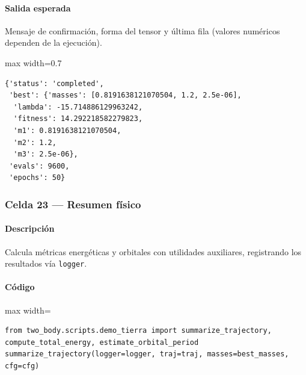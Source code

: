 \paragraph{Salida esperada} Mensaje de confirmación, forma del tensor y última fila (valores numéricos dependen de la ejecución).

\begin{listing}[H]
\caption{Ejemplo Salida}
\begin{adjustbox}{max width=0.7\textwidth}
\begin{minipage}{\textwidth}
\begin{verbatim}
{'status': 'completed',
 'best': {'masses': [0.8191638121070504, 1.2, 2.5e-06],
  'lambda': -15.714886129963242,
  'fitness': 14.292218582279823,
  'm1': 0.8191638121070504,
  'm2': 1.2,
  'm3': 2.5e-06},
 'evals': 9600,
 'epochs': 50}
\end{verbatim}
\end{minipage}
\end{adjustbox}
\end{listing}

\subsubsection*{Celda 23 — Resumen físico}
\paragraph{Descripción} Calcula métricas energéticas y orbitales con utilidades auxiliares, registrando los resultados vía \texttt{logger}.
\paragraph{Código}
\begin{listing}[H]
\caption{Celda 23: resumen físico de la trayectoria}
\begin{adjustbox}{max width=\textwidth}
\begin{minipage}{\textwidth}
\begin{verbatim}
from two_body.scripts.demo_tierra import summarize_trajectory, compute_total_energy, estimate_orbital_period
summarize_trajectory(logger=logger, traj=traj, masses=best_masses, cfg=cfg)
\end{verbatim}
\end{minipage}
\end{adjustbox}
\end{listing}
